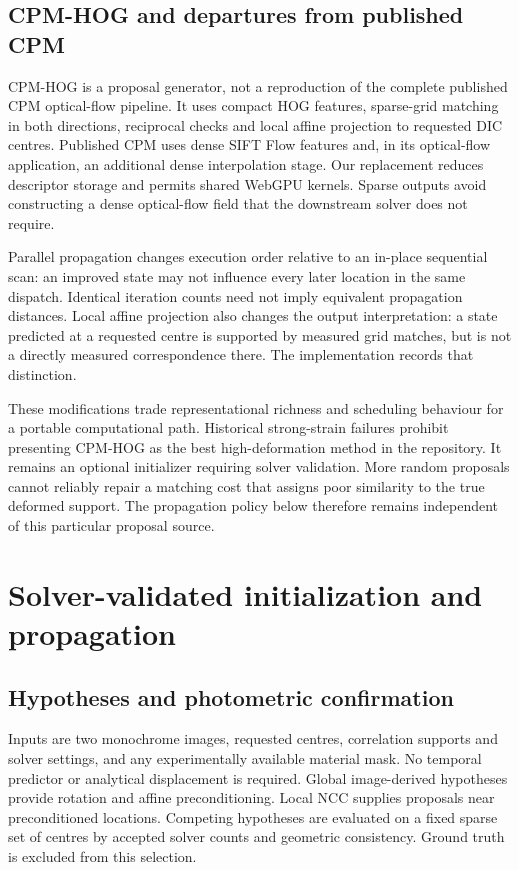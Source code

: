 \documentclass[11pt,a4paper]{article}
\begin{document}
\subsection{CPM-HOG and departures from published CPM}
CPM-HOG is a proposal generator, not a reproduction of the complete published CPM optical-flow pipeline. It uses compact HOG features, sparse-grid matching in both directions, reciprocal checks and local affine projection to requested DIC centres. Published CPM uses dense SIFT Flow features and, in its optical-flow application, an additional dense interpolation stage. Our replacement reduces descriptor storage and permits shared WebGPU kernels. Sparse outputs avoid constructing a dense optical-flow field that the downstream solver does not require.

Parallel propagation changes execution order relative to an in-place sequential scan: an improved state may not influence every later location in the same dispatch. Identical iteration counts need not imply equivalent propagation distances. Local affine projection also changes the output interpretation: a state predicted at a requested centre is supported by measured grid matches, but is not a directly measured correspondence there. The implementation records that distinction.

These modifications trade representational richness and scheduling behaviour for a portable computational path. Historical strong-strain failures prohibit presenting CPM-HOG as the best high-deformation method in the repository. It remains an optional initializer requiring solver validation. More random proposals cannot reliably repair a matching cost that assigns poor similarity to the true deformed support. The propagation policy below therefore remains independent of this particular proposal source.

\section{Solver-validated initialization and propagation}
\subsection{Hypotheses and photometric confirmation}
Inputs are two monochrome images, requested centres, correlation supports and solver settings, and any experimentally available material mask. No temporal predictor or analytical displacement is required. Global image-derived hypotheses provide rotation and affine preconditioning. Local NCC supplies proposals near preconditioned locations. Competing hypotheses are evaluated on a fixed sparse set of centres by accepted solver counts and geometric consistency. Ground truth is excluded from this selection.
\end{document}
